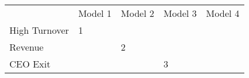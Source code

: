 \begin{table}[]
	\begin{tabular}{lllll}
		& Model 1 & Model 2 & Model 3 & Model 4 \\
		High Turnover & 1       &         &         &         \\
		Revenue       &         & 2       &         &         \\
		CEO Exit      &         &         & 3       &        
	\end{tabular}
\end{table}
